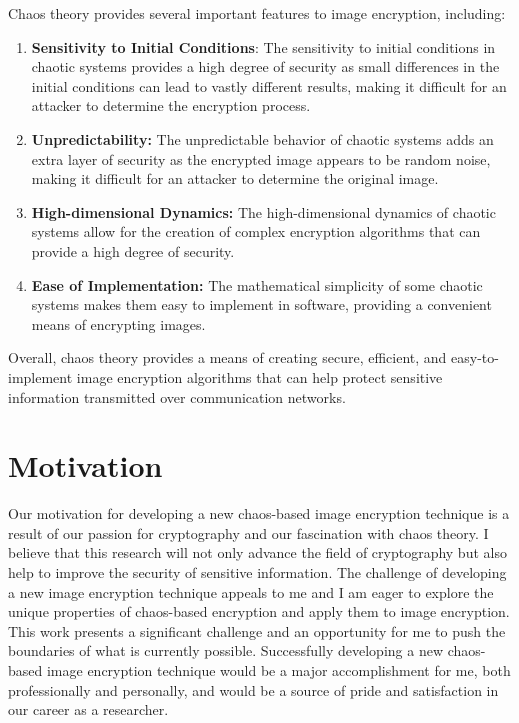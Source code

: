 \documentclass[11pt,a4paper,english]{article}
\begin{document}
Chaos theory provides several important features to image encryption, including:
\begin{enumerate}
    \item \textbf{Sensitivity to Initial Conditions}: The sensitivity to initial conditions in chaotic systems provides a high degree of security as small differences in the initial conditions can lead to vastly different results, making it difficult for an attacker to determine the encryption process.
    \item \textbf{Unpredictability:} The unpredictable behavior of chaotic systems adds an extra layer of security as the encrypted image appears to be random noise, making it difficult for an attacker to determine the original image.
    \item \textbf{High-dimensional Dynamics:} The high-dimensional dynamics of chaotic systems allow for the creation of complex encryption algorithms that can provide a high degree of security.
    \item \textbf{Ease of Implementation:} The mathematical simplicity of some chaotic systems makes them easy to implement in software, providing a convenient means of encrypting images.
\end{enumerate}
Overall, chaos theory provides a means of creating secure, efficient, and easy-to-implement image encryption algorithms that can help protect sensitive information transmitted over communication networks.
\newpage
\section{Motivation}
Our motivation for developing a new chaos-based image encryption technique is a result of our passion for cryptography and our fascination with chaos theory. I believe that this research will not only advance the field of cryptography but also help to improve the security of sensitive information. The challenge of developing a new image encryption technique appeals to me and I am eager to explore the unique properties of chaos-based encryption and apply them to image encryption. This work presents a significant challenge and an opportunity for me to push the boundaries of what is currently possible. Successfully developing a new chaos-based image encryption technique would be a major accomplishment for me, both professionally and personally, and would be a source of pride and satisfaction in our career as a researcher.
\paragraph{}
\newpage
\end{document}
